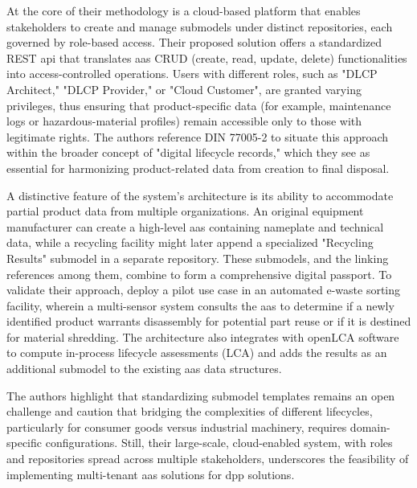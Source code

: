 At the core of their methodology is a cloud-based platform that enables stakeholders to create and manage submodels under distinct repositories, each governed by role-based access. Their proposed solution offers a standardized REST \ac{api} that translates \ac{aas} CRUD (create, read, update, delete) functionalities into access-controlled operations. Users with different roles, such as "DLCP Architect," "DLCP Provider," or "Cloud Customer", are granted varying privileges, thus ensuring that product-specific data (for example, maintenance logs or hazardous-material profiles) remain accessible only to those with legitimate rights. The authors reference DIN 77005-2 to situate this approach within the broader concept of "digital lifecycle records," which they see as essential for harmonizing product-related data from creation to final disposal. \autocite{Pourjafarian.2023}

A distinctive feature of the system’s architecture is its ability to accommodate partial product data from multiple organizations. An original equipment manufacturer can create a high-level \ac{aas} containing nameplate and technical data, while a recycling facility might later append a specialized "Recycling Results" submodel in a separate repository. These submodels, and the linking references among them, combine to form a comprehensive digital passport. To validate their approach, \textcite{Pourjafarian.2023} deploy a pilot use case in an automated e-waste sorting facility, wherein a multi-sensor system consults the \ac{aas} to determine if a newly identified product warrants disassembly for potential part reuse or if it is destined for material shredding. The architecture also integrates with openLCA software to compute in-process lifecycle assessments (LCA) and adds the results as an additional submodel to the existing \ac{aas} data structures. \autocite{Pourjafarian.2023}

The authors highlight that standardizing submodel templates remains an open challenge and caution that bridging the complexities of different lifecycles, particularly for consumer goods versus industrial machinery, requires domain-specific configurations. Still, their large-scale, cloud-enabled system, with roles and repositories spread across multiple stakeholders, underscores the feasibility of implementing multi-tenant \ac{aas} solutions for \ac{dpp} solutions. \autocite{Pourjafarian.2023}

